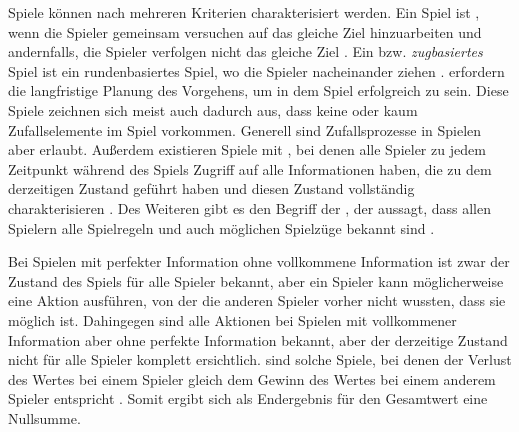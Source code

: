 Spiele können nach mehreren Kriterien charakterisiert werden. Ein Spiel ist , wenn die Spieler gemeinsam versuchen auf das gleiche Ziel hinzuarbeiten und  andernfalls, \dash die Spieler verfolgen nicht das gleiche Ziel \cite{2018.CooperativeGames}. Ein  bzw. \emph{zugbasiertes} Spiel ist ein rundenbasiertes Spiel, wo die Spieler nacheinander ziehen \cite[S. 251]{2018.SequentialGame}.  erfordern die langfristige Planung des Vorgehens, um in dem Spiel erfolgreich zu sein. Diese Spiele zeichnen sich meist auch dadurch aus, dass keine oder kaum Zufallselemente im Spiel vorkommen. Generell sind Zufallsprozesse in Spielen aber erlaubt. Außerdem existieren Spiele mit , bei denen alle Spieler zu jedem Zeitpunkt während des Spiels Zugriff auf alle Informationen haben, die zu dem derzeitigen Zustand geführt haben und diesen Zustand vollständig charakterisieren \cite[S. 156]{1194.SearchAndAiInGames}. Des Weiteren gibt es den Begriff der , der aussagt, dass allen Spielern alle Spielregeln und auch möglichen Spielzüge bekannt sind \cite[S. 1]{2017.AlphaBeta}.

Bei Spielen mit perfekter Information ohne vollkommene Information ist zwar der Zustand des Spiels für alle Spieler bekannt, aber ein Spieler kann möglicherweise eine Aktion ausführen, von der die anderen Spieler vorher nicht wussten, dass sie möglich ist. Dahingegen sind alle Aktionen bei Spielen mit vollkommener Information aber ohne perfekte Information bekannt, aber der derzeitige Zustand nicht für alle Spieler komplett ersichtlich.  sind solche Spiele, bei denen der Verlust des Wertes bei einem Spieler gleich dem Gewinn des Wertes bei einem anderem Spieler entspricht \cite{2022.ZeroSumGame}. Somit ergibt sich als Endergebnis für den Gesamtwert eine Nullsumme.

